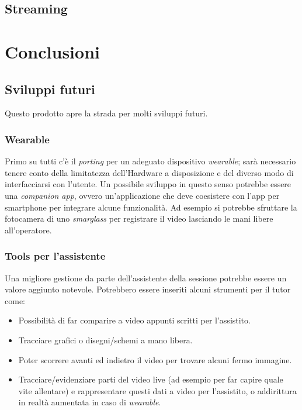 \documentclass[conference]{IEEEtran}
\begin{document}
	\subsection{Streaming}





\section{Conclusioni}
	

	\subsection{Sviluppi futuri}
		Questo prodotto apre la strada per molti sviluppi futuri.\\
		\subsubsection{Wearable}
			Primo su tutti c'è il \textit{porting} per un adeguato dispositivo \textit{wearable}; sarà necessario
			tenere conto della limitatezza dell'Hardware a disposizione e del diverso modo di interfacciarsi con l'utente.
			Un possibile sviluppo in questo senso potrebbe essere una \textit{companion app}, ovvero un'applicazione che
			deve coesistere con l'app per smartphone per integrare alcune funzionalità. Ad esempio si potrebbe sfruttare
			la fotocamera di uno \textit{smarglass} per registrare il video lasciando le mani libere all'operatore.\\

		\subsubsection{Tools per l'assistente}
			Una migliore gestione da parte dell'assistente della sessione potrebbe essere un valore aggiunto notevole.
			Potrebbero essere inseriti alcuni strumenti per il tutor come:
			\begin{itemize}
				\item Possibilità di far comparire a video appunti scritti per l'assistito.
				\item Tracciare grafici o disegni/schemi a mano libera.
				\item Poter scorrere avanti ed indietro	il video per trovare alcuni fermo immagine.
				\item Tracciare/evidenziare parti del video live (ad esempio per far capire quale vite allentare)
					e rappresentare questi dati a video per l'assistito, o addirittura in realtà aumentata in caso
					di \textit{wearable}.
			\end{itemize}
\end{document}
